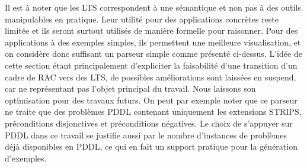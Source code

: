 Il est à noter que les LTS correspondent à une sémantique et non pas à des outils manipulables en pratique. Leur utilité pour des applications concrètes reste limitée et ils seront surtout utilisés de manière formelle pour raisonner. Pour des applications à des exemples simples, ils permettent une meilleure visualisation, et on considère donc suffisant un parseur simple comme présenté ci-dessus. L'idée de cette section étant principalement d'expliciter la faisabilité d'une transition d'un cadre de RAC vers des LTS, de possibles améliorations sont laissées en suspend, car ne représentant pas l'objet principal du travail. Nous laissons son optimisation pour des travaux futurs. On peut par exemple noter que ce parseur ne traite que des problèmes PDDL contenant uniquement les extensions STRIPS, préconditions disjonctives et préconditions négatives. Le choix de s'appuyer sur PDDL dans ce travail se justifie aussi par le nombre d'instances de problèmes déjà disponibles en PDDL, ce qui en fait un support pratique pour la génération d'exemples.



